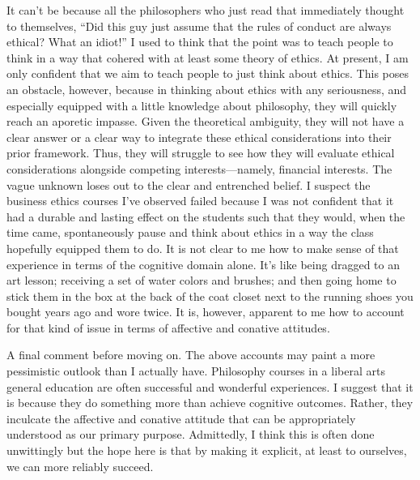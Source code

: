 \documentclass[letterpaper,notitlepage,12pt]{article}
\begin{document}
It can't be because all the philosophers who just read that immediately thought
to themselves, ``Did this guy just assume that the rules of conduct are always
ethical? What an idiot!''
I used to think that the point was to teach people to think in a way that
cohered with at least some theory of ethics.
At present, I am only confident that we aim to teach people to just think about
ethics.
This poses an obstacle, however, because in thinking about ethics with any
seriousness, and especially equipped with a little knowledge about philosophy,
they will quickly reach an aporetic impasse.
Given the theoretical ambiguity, they will not have a clear answer or a clear
way to integrate these ethical considerations into their prior framework.
Thus, they will struggle to see how they will evaluate ethical considerations
alongside competing interests---namely, financial interests.
The vague unknown loses out to the clear and entrenched belief.
I suspect the business ethics courses I've observed failed because I was not
confident that it had a durable and lasting effect on the students such that
they would, when the time came, spontaneously pause and think about ethics in a
way the class hopefully equipped them to do.
It is not clear to me how to make sense of that experience in terms of the
cognitive domain alone.
It's like being dragged to an art lesson; receiving a set of water colors and
brushes; and then going home to stick them in the box at the back of the coat
closet next to the running shoes you bought years ago and wore twice.
It is, however, apparent to me how to account for that kind of issue in terms of
affective and conative attitudes.

A final comment before moving on.
The above accounts may paint a more pessimistic outlook than I actually have.
Philosophy courses in a liberal arts general education are often successful and
wonderful experiences.
I suggest that it is because they do something more than achieve cognitive
outcomes.
Rather, they inculcate the affective and conative attitude that can be
appropriately understood as our primary purpose.
Admittedly, I think this is often done unwittingly but the hope here is that by
making it explicit, at least to ourselves, we can more reliably succeed.
\end{document}
